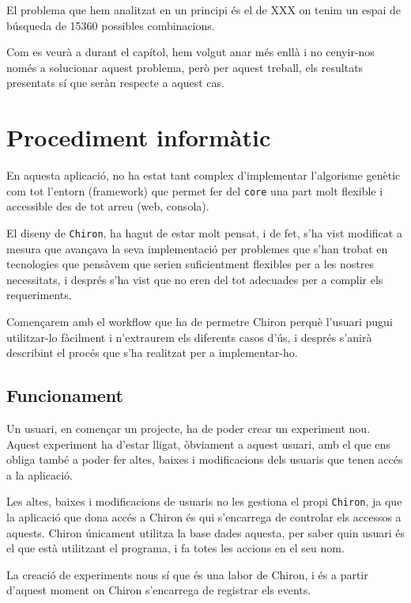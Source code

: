 \documentclass[titlepage,a4paper,12pt]{book}
\begin{document}
	El problema que hem analitzat en un principi és el de XXX
	on tenim un espai de búsqueda de 15360 possibles combinacions.

	Com es veurà a durant el capítol, hem volgut anar més enllà i no cenyir-nos
	només a solucionar aquest problema, però per aquest treball, els resultats
	presentats sí que seràn respecte a aquest cas.

\section{Procediment informàtic} %
\label{sec:Procediment informatic}

En aquesta aplicació, no ha estat tant complex d'implementar l'algorisme genètic
com tot l'entorn (framework) que permet fer del \texttt{core} una part molt
flexible i accessible des de tot arreu (web, consola).

El diseny de \texttt{Chiron}, ha hagut de estar molt pensat, i de fet, s'ha vist
modificat a mesura que avançava la seva implementació per problemes que s'han
trobat en tecnologies que pensàvem que serien suficientment flexibles per a les
nostres necessitats, i després s'ha vist que no eren del tot adecuades per a
complir els requeriments.

Començarem amb el workflow que ha de permetre Chiron perquè l'usuari pugui
utilitzar-lo fàcilment i n'extraurem els diferents casos d'ús, i després
s'anirà describint el procés que s'ha realitzat per a implementar-ho.

\subsection{Funcionament} %
\label{sub:Funcionament}

Un usuari, en començar un projecte, ha de poder crear un experiment nou.  Aquest
experiment ha d'estar lligat, òbviament a aquest usuari, amb el que ens obliga
també a poder fer altes, baixes i modificacions dels usuaris que tenen accés a
la aplicació.

Les altes, baixes i modificacions de usuaris no les gestiona el propi
\texttt{Chiron}, ja que la aplicació que dona accés a Chiron és qui s'encarrega
de controlar els accessos a aquests.  Chiron únicament utilitza la base dades
aquesta, per saber quin usuari és el que està utilitzant el programa, i fa totes
les accions en el seu nom.

La creació de experiments nous sí que és una labor de Chiron, i és a partir
d'aquest moment on Chiron s'encarrega de registrar els events.
\end{document}

